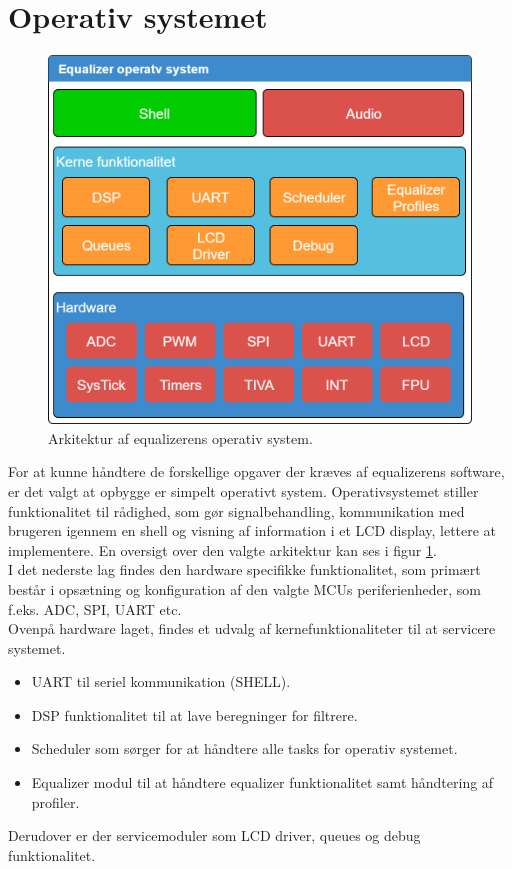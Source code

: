 \section{Operativ systemet}

\begin{figure}[h!]
	\centering
	\includegraphics[width=.5\textwidth]{billeder/eq_os.png}
	\caption{Arkitektur af equalizerens operativ system.}
	\label{fig:eq_os}
\end{figure}

For at kunne håndtere de forskellige opgaver der kræves af equalizerens software, er det valgt at opbygge er simpelt operativt system.
Operativsystemet stiller funktionalitet til rådighed, som gør signalbehandling, kommunikation med brugeren igennem en shell og visning af information i et LCD display, lettere at implementere. En oversigt over den valgte arkitektur kan ses i figur \ref{fig:eq_os}.\\

I det nederste lag findes den hardware specifikke funktionalitet, som primært består i opsætning og konfiguration af den valgte MCUs periferienheder, som f.eks. ADC, SPI, UART etc.\\
 
Ovenpå hardware laget, findes et udvalg af kernefunktionaliteter til at servicere systemet.
\begin{itemize}[noitemsep]
	\item UART til seriel kommunikation (SHELL).
	\item DSP funktionalitet til at lave beregninger for filtrere.
	\item Scheduler som sørger for at håndtere alle tasks for operativ systemet.
	\item Equalizer modul til at håndtere equalizer funktionalitet samt håndtering af profiler. 
\end{itemize}

Derudover er der servicemoduler som LCD driver, queues og debug funktionalitet.\\

